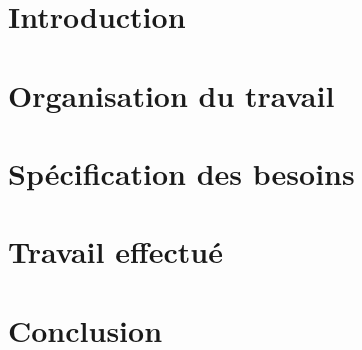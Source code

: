 \documentclass[a4paper
,oneside,11pt]{article}
\begin{document}
\section*{Introduction}\thispagestyle{fancy}



\section{Organisation du travail}


\section{Spécification des besoins}


\section{Travail effectué}




\section*{Conclusion}\thispagestyle{fancy}



%
\end{document}
